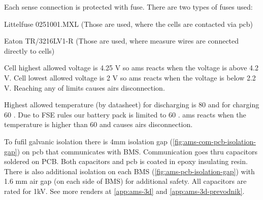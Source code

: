 Each sense connection is protected with fuse. There are two types of fuses used: 

\noindent Littelfuse 0251001.MXL (Those are used, where the cells are contacted via \gls{pcb})

\noindent Eaton TR/3216LV1-R (Those are used, where measure wires are connected directly to cells)

Cell highest allowed voltage is 4.25 V so \gls{ams} reacts when the voltage is above 4.2 V. Cell lowest allowed voltage is 2 V so \gls{ams} reacts when the voltage is below 2.2 V. Reaching any of limits causes \glspl{air} disconnection.

Highest allowed temperature (by datasheet) for discharging is 80 \degC and for charging 60 \degC. Due to FSE rules our battery pack is limited to 60 \degC. \gls{ams} reacts when the temperature is higher than 60 \degC and causes \glspl{air} disconnection.

To fufil galvanic isolation there is 4mm isolation gap (\ref{fig:ams-com-pcb-isolation-gap}) on pcb that communicates with BMS. Communication goes thru capacitors soldered on PCB. Both capacitors and pcb is coated in epoxy insulating resin. There is also additional isolation on each BMS (\ref{fig:ams-pcb-isolation-gap}) with 1.6 mm air gap (on each side of BMS) for additional safety. All capacitors are rated for 1kV. See more renders at \ref{app:ams-3d} and \ref{app:ams-3d-prevodnik}.

